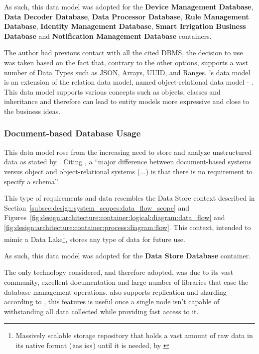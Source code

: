 As such, this data model was adopted for the \textbf{Device Management Database}, \textbf{Data Decoder Database}, \textbf{Data Processor Database}, \textbf{Rule Management Database}, \textbf{Identity Management Database}, \textbf{Smart Irrigation Business Database} and \textbf{Notification Management Database} containers. 

The author had previous contact with all the cited \gls{DBMS}, the decision to use  was taken based on the fact that, contrary to the other options,  supports a vast number of Data Types such as \gls{JSON}, Arrays, \gls{UUID}, and Ranges. 's data model is an extension of the relation data model, named object-relational data model - \cite{elmasri2000fundamentals}. This data model supports various concepts such as objects, classes and inheritance and therefore can lead to entity models more expressive and close to the business ideas.

\subsubsection*{Document-based Database Usage}
\label{subsubsec:implementation:decisions:database:nosql}

This data model rose from the increasing need to store and analyze unstructured data as stated by \cite{miloslavskaya2016big}.  Citing \cite{elmasri2000fundamentals}, a ``major difference between document-based systems versus object and object-relational systems (...) is that there is no requirement to specify a schema''.

This type of requirements and data resembles the Data Store context described in Section~\ref{subsec:design:system_scopes:data_flow_scope} and Figures~\ref{fig:design:architecture:container:logical:diagram:data_flow} and \ref{fig:design:architecture:container:process:diagram:flow}. This context, intended to mimic a Data Lake\footnote{Massively scalable storage repository that holds a vast amount of raw data in its native format («as is») until it is needed, by \cite{miloslavskaya2016big}}, stores any type of data for future use.

As such, this data model was adopted for the \textbf{Data Store Database} container. 

The only technology considered, and therefore adopted, was  due to its vast community, excellent documentation and large number of libraries that ease the database management operations.  also supports replication and sharding according to \cite{elmasri2000fundamentals}, this features is useful once a single node isn't capable of withstanding all data collected while providing fast access to it.

